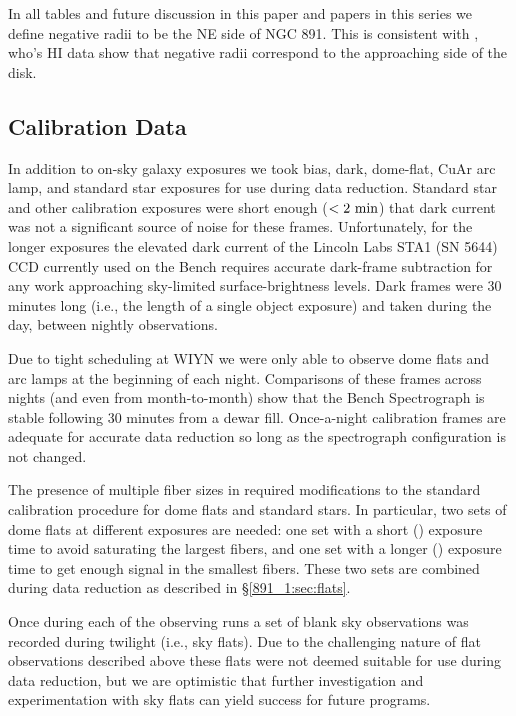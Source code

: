 In all tables and future discussion in this paper and papers in this
series we define negative radii to be the NE side of NGC 891. This is
consistent with \citet{Oosterloo07}, who's HI data show that negative
radii correspond to the approaching side of the disk.

\subsection{Calibration Data}
\label{891_1:sec:cal_data}

In addition to on-sky galaxy exposures we took bias, dark, dome-flat,
CuAr arc lamp, and standard star exposures for use during data
reduction. Standard star and other calibration exposures were short
enough ($<2~\mathrm{min} $) that dark current was not a significant
source of noise for these frames. Unfortunately, for the longer
exposures the elevated dark current of the Lincoln Labs STA1 (SN 5644)
CCD currently used on the Bench requires accurate dark-frame
subtraction for any work approaching sky-limited surface-brightness
levels.  Dark frames were 30 minutes long (i.e., the length of a
single object exposure) and taken during the day, between nightly
observations.

Due to tight scheduling at WIYN we were only able to observe dome
flats and arc lamps at the beginning of each night. Comparisons
of these frames across nights (and even from month-to-month) show that
the Bench Spectrograph is stable following 30 minutes from a dewar
fill. Once-a-night calibration frames are adequate for accurate data
reduction so long as the spectrograph configuration is not changed.

The presence of multiple fiber sizes in \GP required modifications to
the standard calibration procedure for dome flats and standard
stars. In particular, two sets of dome flats at different exposures
are needed: one set with a short () exposure time to
avoid saturating the largest fibers, and one set with a longer
() exposure time to get enough signal in the smallest
fibers. These two sets are combined during data reduction as described
in \S\ref{891_1:sec:flats}.

Once during each of the observing runs a set of blank sky observations
was recorded during twilight (i.e., sky flats). Due to the challenging
nature of flat observations described above these flats were not
deemed suitable for use during data reduction, but we are optimistic
that further investigation and experimentation with sky flats can
yield success for future \GP programs.

